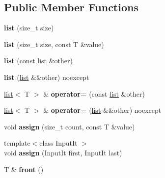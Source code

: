 \subsection*{Public Member Functions}
\begin{DoxyCompactItemize}
\item 
\mbox{\label{classmystl_1_1list_a4ea49eb619a5db618dde2f1e26161107}} 
{\bfseries list} (size\+\_\+t size)
\item 
\mbox{\label{classmystl_1_1list_a9cb7a1e72cf55861d9761ddfa3fd8c5a}} 
{\bfseries list} (size\+\_\+t size, const T \&value)
\item 
\mbox{\label{classmystl_1_1list_af467a792d22299a0fac77503ff543abb}} 
{\bfseries list} (const \hyperlink{classmystl_1_1list}{list} \&other)
\item 
\mbox{\label{classmystl_1_1list_aa2f909411a7778057b255fcc72c9d163}} 
{\bfseries list} (\hyperlink{classmystl_1_1list}{list} \&\&other) noexcept
\item 
\mbox{\label{classmystl_1_1list_a38865cb92346b6d646045733fbfd08ba}} 
\hyperlink{classmystl_1_1list}{list}$<$ T $>$ \& {\bfseries operator=} (const \hyperlink{classmystl_1_1list}{list} \&other)
\item 
\mbox{\label{classmystl_1_1list_a0568c3431adf1be6116e7e5cee91cbae}} 
\hyperlink{classmystl_1_1list}{list}$<$ T $>$ \& {\bfseries operator=} (\hyperlink{classmystl_1_1list}{list} \&\&other) noexcept
\item 
\mbox{\label{classmystl_1_1list_a432095780fa7c6aa86666e10c78fae1a}} 
void {\bfseries assign} (size\+\_\+t count, const T \&value)
\item 
\mbox{\label{classmystl_1_1list_a2faa20a47982c93e4b1ecd267b62d96f}} 
{\footnotesize template$<$class Input\+It $>$ }\\void {\bfseries assign} (Input\+It first, Input\+It last)
\item 
\mbox{\label{classmystl_1_1list_a8bd89a11d055a58f13ab0640e26f9529}} 
T \& {\bfseries front} ()

\end{DoxyCompactItemize}
